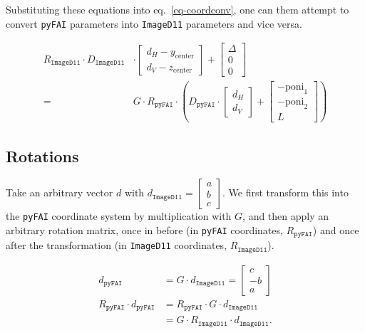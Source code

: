 \documentclass[12pt]{article}
\begin{document}
Substituting these equations into eq.~\ref{eq-coordconv}, one can them
attempt to convert \texttt{pyFAI} parameters into \texttt{ImageD11}
parameters and vice versa.

\begin{align}
  R_{\mathtt{ImageD11}}
  \cdot
  D_{\mathtt{ImageD11}}
  &
  \cdot
  \begin{bmatrix}
    d_H - y_{\mathrm{center}} \\
    d_V - z_{\mathrm{center}} 
  \end{bmatrix}
  +
  \begin{bmatrix} \Delta \\ 0 \\ 0 \end{bmatrix}
  \nonumber \\
  = &
  G \cdot
  R_{\mathtt{pyFAI}}
  \cdot
  \left(
  D_{\mathtt{pyFAI}}
  \cdot
  \begin{bmatrix} d_H \\ d_V \end{bmatrix}
  +
  \begin{bmatrix} -\mathrm{poni}_1 \\ -\mathrm{poni}_2 \\ L \end{bmatrix}
  \right)
  \label{eq-transformation}
\end{align}

\subsection{Rotations}

Take an arbitrary vector $d$ with $d_{\mathtt{ImageD11}}
= \begin{bmatrix} a \\ b \\ c \end{bmatrix}$. We first transform this
into the \texttt{pyFAI} coordinate system by multiplication with $G$,
and then apply an arbitrary rotation matrix, once in before (in
\texttt{pyFAI} coordinates, $R_{\mathtt{pyFAI}}$) and once after the
transformation (in \texttt{ImageD11} coordinates,
$R_{\mathtt{ImageD11}}$).

\begin{align}
    d_{\mathtt{pyFAI}}
    & =
    G \cdot d_{\mathtt{ImageD11}}
    = \begin{bmatrix} c \\ -b \\ a \end{bmatrix}
    \\
    R_{\mathtt{pyFAI}} \cdot d_{\mathtt{pyFAI}}
    & =
    R_{\mathtt{pyFAI}} \cdot G \cdot d_{\mathtt{ImageD11}}
    \\
    & = G \cdot R_{\mathtt{ImageD11}} \cdot d_{\mathtt{ImageD11}}.
\end{align}
\end{document}
